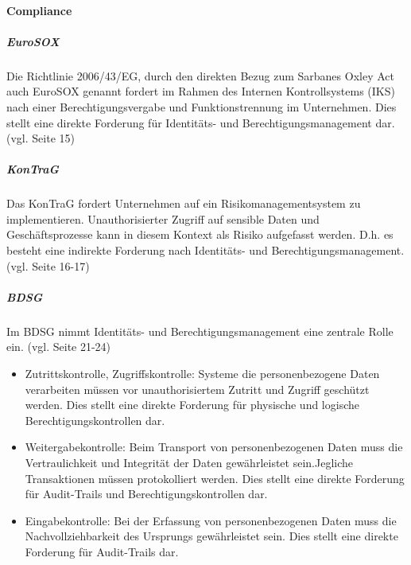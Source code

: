 \documentclass[11pt]{article}
\begin{document}
\paragraph{Compliance}
\subparagraph{EuroSOX}
Die Richtlinie 2006/43/EG, durch den direkten Bezug zum Sarbanes Oxley Act auch EuroSOX genannt fordert im Rahmen des Internen Kontrollsystems (IKS) nach einer Berechtigungsvergabe und Funktionstrennung im Unternehmen. Dies stellt eine direkte Forderung für Identitäts- und Berechtigungsmanagement dar. (vgl. \cite{conta2017leitfaden} Seite 15)
\subparagraph{KonTraG}
Das KonTraG fordert Unternehmen auf ein Risikomanagementsystem zu implementieren. Unauthorisierter Zugriff auf sensible Daten und Geschäftsprozesse kann in diesem Kontext als Risiko aufgefasst werden. D.h. es besteht eine indirekte Forderung nach Identitäts- und Berechtigungsmanagement. (vgl. \cite{conta2017leitfaden} Seite 16-17)
\subparagraph{BDSG}
Im BDSG nimmt Identitäts- und Berechtigungsmanagement eine zentrale Rolle ein. (vgl. \cite{conta2017leitfaden} Seite 21-24)
\begin{itemize}
  \item Zutrittskontrolle, Zugriffskontrolle: Systeme die personenbezogene Daten verarbeiten müssen vor unauthorisiertem Zutritt und Zugriff geschützt werden. Dies stellt eine direkte Forderung für physische und logische Berechtigungskontrollen dar.
  \item Weitergabekontrolle: Beim Transport von personenbezogenen Daten muss die Vertraulichkeit und Integrität der Daten gewährleistet sein.Jegliche Transaktionen müssen protokolliert werden. Dies stellt eine direkte Forderung für Audit-Trails und Berechtigungskontrollen dar.
  \item Eingabekontrolle: Bei der Erfassung von personenbezogenen Daten muss die Nachvollziehbarkeit des Ursprungs gewährleistet sein. Dies stellt eine direkte Forderung für Audit-Trails dar.
\end{itemize}
\end{document}
